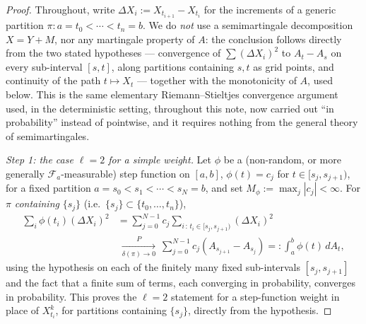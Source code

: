 \documentclass[10pt,a4paper]{amsart}
\begin{document}
\begin{proof}
Throughout, write $\Delta X_i:=X_{t_{i+1}}-X_{t_i}$ for the increments of a
generic partition $\pi\colon a=t_0<\cdots<t_n=b$. We do \emph{not} use a
semimartingale decomposition $X=Y+M$, nor any martingale property of $A$:
the conclusion follows directly from the two stated hypotheses ---
convergence of $\sum(\Delta X_i)^2$ to $A_t-A_s$ on every sub-interval
$[s,t]$, along partitions containing $s,t$ as grid points, and continuity
of the path $t\mapsto X_t$ --- together with the
monotonicity of $A$, used below. This is the same elementary
Riemann--Stieltjes convergence argument used, in the deterministic
setting, throughout this note, now carried out ``in probability'' instead
of pointwise, and it requires nothing from the general theory of
semimartingales.

\medskip\noindent\textit{Step 1: the case $\ell=2$ for a simple weight.}
Let $\phi$ be a (non-random, or more generally $\mathcal F_a$-measurable)
step function on $[a,b]$, $\phi(t)=c_j$ for $t\in[s_j,s_{j+1})$, for a
fixed partition $a=s_0<s_1<\cdots<s_N=b$, and set
$M_\phi:=\max_j|c_j|<\infty$. For $\pi$ \emph{containing} $\{s_j\}$
(i.e.\ $\{s_j\}\subset\{t_0,\ldots,t_n\}$),
\begin{align*}
\sum_i\phi(t_i)(\Delta X_i)^2&=\sum_{j=0}^{N-1}c_j\!\!
\sum_{i\,:\,t_i\in[s_j,s_{j+1})}\!\!(\Delta X_i)^2\\
&\ \xrightarrow[\delta(\pi)\to0]{P}\ \sum_{j=0}^{N-1}c_j(A_{s_{j+1}}-A_{s_j})
=:\int_a^b\phi(t)\,dA_t,
\end{align*}
using the hypothesis on each of the finitely many fixed sub-intervals
$[s_j,s_{j+1}]$ and the fact that a finite sum of terms, each converging
in probability, converges in probability. This proves the $\ell=2$
statement for a step-function weight in place of $X_{t_i}^k$, for
partitions containing $\{s_j\}$, directly from the hypothesis.


\end{proof}
\end{document}
